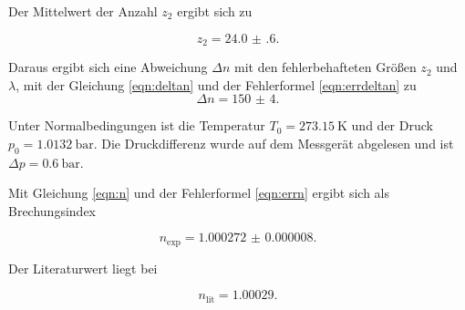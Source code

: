 

\noindent Der Mittelwert der Anzahl $z_2$ ergibt sich zu 

\begin{equation*}
    z_2 = \num{24.0(6)}.
\end{equation*}

\noindent Daraus ergibt sich eine Abweichung $\Delta n$ mit den fehlerbehafteten Größen $z_2$ und $\lambda$, mit der Gleichung \eqref{eqn:deltan} und der Fehlerformel \eqref{eqn:errdeltan} zu 
\begin{equation*}
    \Delta n = \num{150(4)}.
\end{equation*}

\noindent Unter Normalbedingungen ist die Temperatur $T_0 = \SI{273.15}{\kelvin}$ und der Druck $ p_0 = \SI{1.0132}{\bar}.$ Die Druckdifferenz wurde auf dem Messgerät abgelesen und ist $\Delta p= \SI{0.6}{\bar}$.

\noindent Mit Gleichung \eqref{eqn:n} und der Fehlerformel \eqref{eqn:errn} ergibt sich als Brechungsindex

\begin{equation*}
    n_\text{exp} = \num{1.000272(8)}.
\end{equation*}

\noindent Der Literaturwert \cite{luft} liegt bei

\begin{equation*}
    n_\text{lit} = \num{1.00029}.
\end{equation*}

